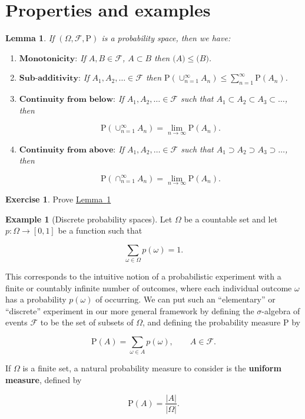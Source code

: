 \documentclass[11pt]{report}
\providecommand{\cal}{\mathcal}
\theoremstyle{plain}
\newtheorem{lem}[thm]{Lemma}
\theoremstyle{definition}
\newtheorem{example}[thm]{Example}
\newtheorem{xexercise}[thm]{Exercise}
\begin{document}
\section{Properties and examples}

\begin{lem}
\label{probspaceproperties}
If $(\Omega, {\cal F}, \mathrm{P})$ is a probability
space, then we have:

\begin{enumerate}[label=(\roman*)]
\item $\textbf{Monotonicity:}$ If $A,B \in {\cal F}$,
$A\subset B$ then $\mathrm(A)\le \mathrm(B)$.

\item $\textbf{Sub-additivity:}$ If
$A_1,A_2,\ldots \in {\cal F}$ then
$\mathrm{P}(\cup_{n=1}^\infty A_n) \le
\sum_{n=1}^\infty \mathrm{P}(A_n)$.

\item $\textbf{Continuity from below:}$ If
$A_1,A_2,\ldots \in {\cal F}$ such that
$A_1 \subset A_2 \subset A_3 \subset \ldots$, then

\[
\mathrm{P}(\cup_{n=1}^\infty A_n) = \lim_{n\to\infty} \mathrm{P}(A_n).
\]

\item $\textbf{Continuity from above:}$ If
$A_1,A_2,\ldots \in {\cal F}$ such that
$A_1 \supset A_2 \supset A_3 \supset \ldots$, then

\[
\mathrm{P}(\cap_{n=1}^\infty A_n) = \lim_{n\to\infty} \mathrm{P}(A_n).
\]
\end{enumerate}

\end{lem}

\begin{xexercise}
Prove \hyperref[probspaceproperties]{Lemma~\ref*{probspaceproperties}}
\end{xexercise}

\begin{example}[Discrete probability spaces]
Let $\Omega$ be a countable set and let
$p:\Omega\to[0,1]$ be a function such that

\[
\sum_{\omega \in \Omega} p(\omega) = 1.
\]

\noindent This corresponds to the intuitive notion of a
probabilistic experiment with a finite or countably
infinite number of outcomes, where each individual
outcome $\omega$ has a probability $p(\omega)$ of
occurring. We can put such an ``elementary'' or
``discrete'' experiment in our more general framework
by defining the $\sigma$-algebra of events ${\cal F}$
to be the set of subsets of $\Omega$, and defining
the probability measure $\mathrm{P}$ by

\[
\mathrm{P}(A) = \sum_{\omega \in A} p(\omega), \qquad A\in {\cal F}.
\]

\noindent If $\Omega$ is a finite set, a natural probability
measure to consider is the \textbf{uniform measure},
defined by

\[
\mathrm{P}(A) = \frac{|A|}{|\Omega|}.
\]

\end{example}
\end{document}
